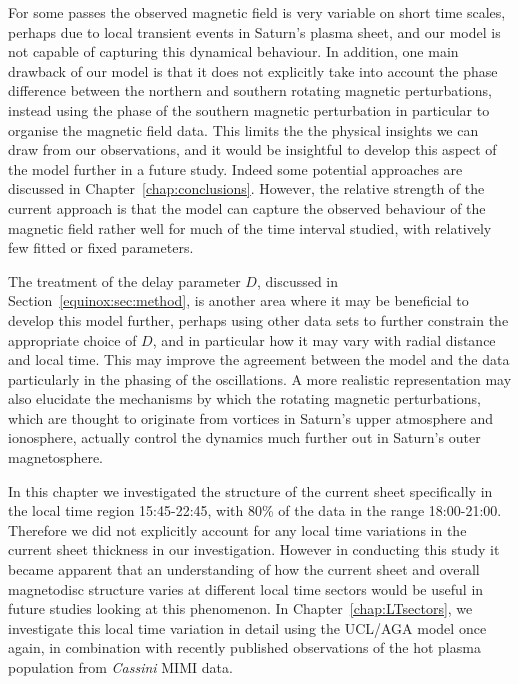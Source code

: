 For some passes the observed magnetic field is very variable on short time scales, perhaps due to local transient events in Saturn's plasma sheet, and our model is not capable of capturing this dynamical behaviour. In addition, one main drawback of our model is that it does not explicitly take into account the phase difference between the northern and southern rotating magnetic perturbations, instead using the phase of the southern magnetic perturbation in particular to organise the magnetic field data. This limits the the physical insights we can draw from our observations, and it would be insightful to develop this aspect of the model further in a future study. Indeed some potential approaches are discussed in Chapter~\ref{chap:conclusions}. However, the relative strength of the current approach is that the model can capture the observed behaviour of the magnetic field rather well for much of the time interval studied, with relatively few fitted or fixed parameters.

The treatment of the delay parameter $D$, discussed in Section~\ref{equinox:sec:method}, is another area where it may be beneficial to develop this model further, perhaps using other data sets to further constrain the appropriate choice of $D$, and in particular how it may vary with radial distance and local time. This may improve the agreement between the model and the data particularly in the phasing of the oscillations. A more realistic representation may also elucidate the mechanisms by which the rotating magnetic perturbations, which are thought to originate from vortices in Saturn's upper atmosphere and ionosphere, actually control the dynamics much further out in Saturn's outer magnetosphere.

In this chapter we investigated the structure of the current sheet specifically in the local time region 15:45-22:45, with 80\% of the data in the range 18:00-21:00. Therefore we did not explicitly account for any local time variations in the current sheet thickness in our investigation. However in conducting this study it became apparent that an understanding of how the current sheet and overall magnetodisc structure varies at different local time sectors would be useful in future studies looking at this phenomenon. In Chapter~\ref{chap:LTsectors}, we investigate this local time variation in detail using the UCL/AGA model once again, in combination with recently published observations of the hot plasma population from \textit{Cassini} MIMI data.
